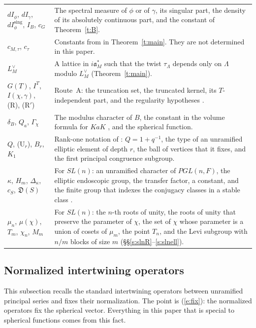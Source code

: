 \documentclass[12pt,letterpaper]{article}
\numberwithin{equation}{section}
\theoremstyle{plain}
\theoremstyle{definition}
\theoremstyle{remark}
\newcommand{\fa}{\mathfrak{a}}
\begin{document}
{\begin{longtable}{@{}>{\raggedright\arraybackslash}p{}>{\raggedright\arraybackslash}p{}@{}}
$dI_\phi$, $dI_\gamma$, $dI^{\mathrm{sing}}_\phi$, $I_B$, $c_G$ & The spectral measure of $\phi$ or of $\gamma$, its singular part, the density of its absolutely continuous part, and the constant of Theorem~\ref{t:B}.\\
$c_{M,\tau}$, $c_\tau$ & Constants from \cite{Ar93} in Theorem~\ref{t:main}. They are not determined in this paper.\\
$L_M^\vee$ & A lattice in $i\fa_M^*$ such that the twist $\tau_\Lambda$ depends only on $\Lambda$ modulo $L_M^\vee$ (Theorem~\ref{t:main}).\\
$G(T)$, $I^T$, $I(\chi,\gamma)$, (R), (R$'$) & Route~A: the truncation set, the truncated kernel, its $T$-independent part, and the regularity hypotheses \cite[\S\S3--4, Rem.~2026.20]{JC26}.\\
$\delta_B$, $Q_a$, $\Gamma_\chi$ & The modulus character of $B$, the constant in the volume formula for $KaK$ \cite[\S3.2]{JC26}, and the spherical function.\\
$Q$, (U$_r$), $B_r$, $K_1$ & Rank-one notation of \cite[\S6]{JC26}: $Q=1+q^{-1}$, the type of an unramified elliptic element of depth $r$, the ball of vertices that it fixes, and the first principal congruence subgroup.\\
$\kappa$, $H_m$, $\Delta_\kappa$, $c_S$, $\mathfrak D(S)$ & For $SL(n)$: an unramified character of $PGL(n,F)$, the elliptic endoscopic group, the transfer factor, a constant, and the finite group that indexes the conjugacy classes in a stable class \cite[\S5]{JC26}.\\
$\mu_n$, $\mu(\chi)$, $T_m$, $\chi_n$, $M_m$ & For $SL(n)$: the $n$-th roots of unity, the roots of unity that preserve the parameter of $\chi$, the set of $\chi$ whose parameter is a union of cosets of $\mu_m$, the point $T_n$, and the Levi subgroup with $n/m$ blocks of size $m$ (\S\S\ref{s:slnR}--\ref{s:slnell}).\\
\end{longtable}
}

\subsection{Normalized intertwining operators}\label{s:norm}

This subsection recalls the standard intertwining operators between unramified principal series and fixes their normalization. The point is (\ref{e:fix}): the normalized operators fix the spherical vector. Everything in this paper that is special to spherical functions comes from this fact.
\end{document}
